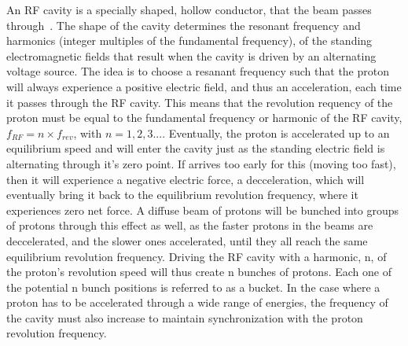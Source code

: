 \par An RF cavity is a specially shaped, hollow
conductor, that the beam passes
through~\cite{LHC:BasicsOfAccelerators_Baird}.  The shape of the
cavity determines the resonant frequency and harmonics (integer
multiples of the fundamental frequency), of the standing
electromagnetic fields that result when the cavity is driven by an
alternating voltage source.  The idea is to choose a resanant
frequency such that the proton will always experience a positive
electric field, and thus an acceleration, each time it passes through
the RF cavity.  This means that the revolution requency of the proton
must be equal to the fundamental frequency or harmonic of the RF
cavity, $f_{RF} = n{\times}f_{rev}$, with $n=1,2,3...$.  Eventually,
the proton is accelerated up to an equilibrium speed and will enter the
cavity just as the standing electric field is alternating through it's
zero point.  If arrives too early for this (moving too fast), then it
will experience a negative electric force, a decceleration, which will
eventually bring it back to the equilibrium revolution frequency,
where it experiences zero net force.  A diffuse beam of protons will
be bunched into groups of protons through this effect as well, as the
faster protons in the beams are deccelerated, and the slower ones
accelerated, until they all reach the same equilibrium revolution
frequency.  Driving  the RF cavity with a harmonic, n, of the proton's
revolution speed will thus create n bunches of protons.  Each one of
the potential n bunch positions is referred to as a bucket.  In the
case where a proton has to be accelerated through a wide range of
energies, the frequency of the cavity must also increase to maintain
synchronization with the proton revolution frequency.  

